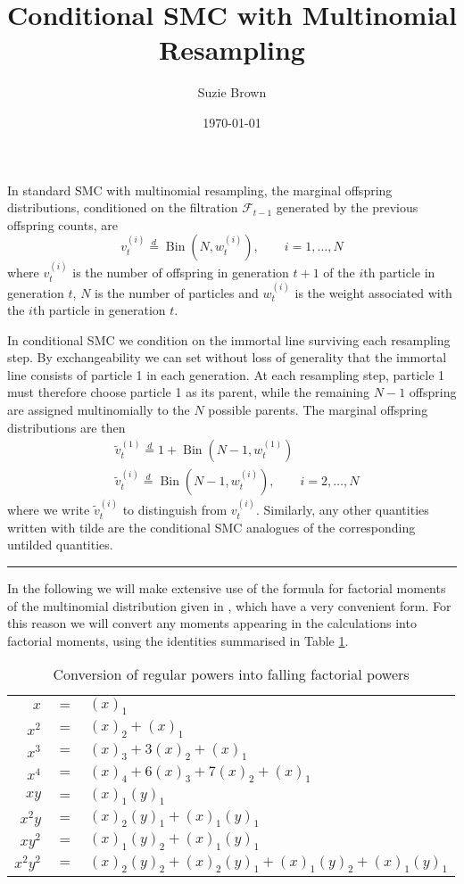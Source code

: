 \documentclass{article}
\title{Conditional SMC with Multinomial Resampling}
\author{Suzie Brown}
\date{\today}
\newcommand{\vt}[2][t]{v_{#1}^{(#2)}}
\newcommand{\vttilde}[2][t]{\tilde{v}_{#1}^{(#2)}}
\newcommand{\wt}[2][t]{w_{#1}^{(#2)}}
\newcommand{\eqdist}{\overset{d}{=}}
\newcommand{\Bin}{\operatorname{Bin}}
\newcommand{\F}{\mathcal{F}_{t-1}}
\newcommand{\myrule}{\\ \rule{\textwidth}{1pt}}
\begin{document}
\maketitle

In standard SMC with multinomial resampling, the marginal offspring distributions, conditioned on the filtration $\F$ generated by the previous offspring counts, are
\begin{equation*}
\vt{i} \eqdist \Bin (N, \wt{i}), \qquad i=1,\dots,N
\end{equation*}
where $\vt{i}$ is the number of offspring in generation $t+1$ of the $i$th particle in generation $t$, $N$ is the number of particles and $\wt{i}$ is the weight associated with the $i$th particle in generation $t$.

In conditional SMC we condition on the immortal line surviving each resampling step. By exchangeability we can set without loss of generality that the immortal line consists of particle 1 in each generation. At each resampling step, particle 1 must therefore choose particle 1 as its parent, while the remaining $N-1$ offspring are assigned multinomially to the $N$ possible parents. The marginal offspring distributions are then
\begin{align*}
& \vttilde{1} \eqdist 1 + \Bin(N-1, \wt{1}) \\
& \vttilde{i} \eqdist \Bin(N-1, \wt{i}), \qquad i=2,\dots,N
\end{align*}
where we write $\vttilde{i}$ to distinguish from $\vt{i}$. Similarly, any other quantities written with tilde are the conditional SMC analogues of the corresponding untilded quantities.
\myrule

In the following we will make extensive use of the formula for factorial moments of the multinomial distribution given in \citet{mosimann1962}, which have a very convenient form. For this reason we will convert any moments appearing in the calculations into factorial moments, using the identities summarised in Table \ref{tab:fact_powers}.

\begin{table}
\centering
\begin{tabular}{r c l}
\hline
$x$ & $=$ & $(x)_1$ \\
$x^2$ & $=$ & $(x)_2 + (x)_1$ \\
$x^3$ & $=$ & $(x)_3 + 3(x)_2 + (x)_1$ \\
$x^4$ & $=$ & $(x)_4 + 6(x)_3 + 7(x)_2 + (x)_1$ \\
\hline
$xy$ & $=$ & $(x)_1(y)_1$ \\
$x^2y$ & $=$ & $(x)_2(y)_1 + (x)_1(y)_1$ \\
$xy^2$ & $=$ & $(x)_1(y)_2 + (x)_1(y)_1$ \\
$x^2y^2$ & $=$ & $(x)_2(y)_2 + (x)_2(y)_1 + (x)_1(y)_2 +  (x)_1(y)_1$ \\
\hline
\end{tabular}
\caption{Conversion of regular powers into falling factorial powers}
\label{tab:fact_powers}
\end{table}
\end{document}
